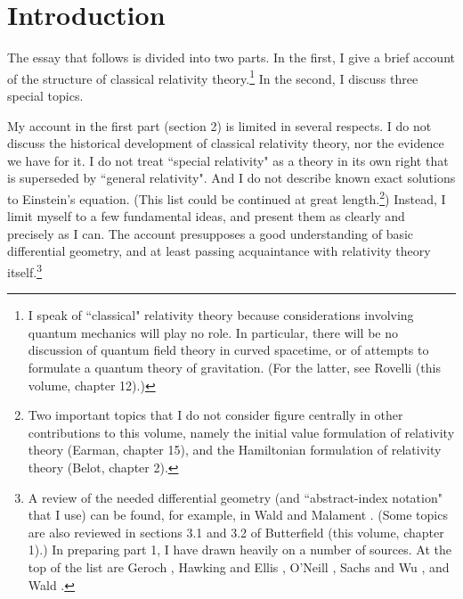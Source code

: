 \documentclass [12] {article}
\theoremstyle{plain}
\numberwithin{figure}{subsection}
\numberwithin{proposition}{subsection}
\begin{document}
\section{Introduction}

The essay that follows is divided into two parts. In the first, I give a brief account of the structure of  classical relativity theory.\footnote{I speak of  ``classical" relativity theory because considerations involving quantum mechanics will play no role. In particular, there will be no discussion of quantum field theory in curved spacetime, or of attempts to formulate a quantum theory of gravitation. (For the latter, see Rovelli (this volume,  chapter 12).)}   In the second, I discuss three special topics. 

My account in the first part (section 2) is limited in several respects. I do not discuss the historical development of classical relativity theory, nor the evidence we have for it.   I do not treat ``special relativity" as a theory in its own right that is superseded by ``general relativity".  And I do not describe known exact solutions to Einstein's equation.  (This list could be continued at great length.\footnote{Two important topics that I do not consider figure centrally in other contributions to this volume, namely the initial value formulation of relativity theory (Earman, chapter 15), and the Hamilton\-ian formulation of relativity theory (Belot, chapter 2).}) 
Instead, I  limit myself to a few fundamental ideas, and present them as clearly and precisely as I can. The account presupposes a good understanding of  basic differential geometry, and at least passing acquaintance with relativity theory itself.\footnote{A review of the needed differential geometry (and ``abstract-index notation" that I use) can be found, for example, in Wald  and Malament . (Some topics are also reviewed in sections 3.1 and 3.2 of Butterfield (this volume, chapter 1).)  In preparing part 1, I have drawn heavily on a number of sources. At the top of the list are  Geroch ,  
Hawking and Ellis ,  O'Neill , Sachs and Wu  , and Wald .}  
\end{document}
